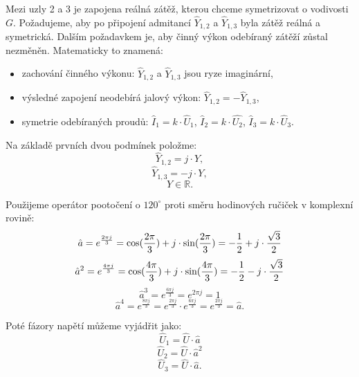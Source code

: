\documentclass{article}
\begin{document}
Mezi uzly 2 a 3 je zapojena reálná zátěž, kterou chceme symetrizovat o vodivosti $G$. Požadujeme, aby po připojení admitancí $\hat{Y}_{1,2}$ a $\hat{Y}_{1,3}$ byla zátěž reálná a symetrická. Dalším požadavkem je, aby činný výkon odebíraný zátěží zůstal nezměněn. Matematicky to znamená:
\begin{itemize}
    \item zachování činného výkonu: $\hat{Y}_{1,2}$ a $\hat{Y}_{1,3}$ jsou ryze imaginární,
    \item výsledné zapojení neodebírá jalový výkon: $\hat{Y}_{1,2} = - \hat{Y}_{1,3}$,
    \item symetrie odebíraných proudů: $\hat{I}_1 = k \cdot \hat{U}_1$, $\hat{I}_2 = k \cdot \hat{U_2}$, $\hat{I}_3 = k \cdot \hat{U}_3$.
\end{itemize}

Na základě prvních dvou podmínek položme:
$$
    \hat{Y}_{1,2} = j \cdot Y,
$$
$$
    \hat{Y}_{1,3} = -j \cdot Y,
$$
$$
    Y \in \mathbb{R}.
$$

Použijeme operátor pootočení o $120^\circ$ proti směru hodinových ručiček v komplexní rovině:
$$
    \hat{a} = e^{\frac{2 \pi j}{3}} = \textrm{cos}(\frac{2 \pi}{3}) + j \cdot \textrm{sin}(\frac{2 \pi}{3}) = -\frac{1}{2} + j \cdot \frac{\sqrt{3}}{2}
$$
$$
    \hat{a}^2 = e^{\frac{4 \pi j}{3}} = \textrm{cos}(\frac{4 \pi}{3}) + j \cdot \textrm{sin}(\frac{4 \pi}{3}) = -\frac{1}{2} - j \cdot \frac{\sqrt{3}}{2}
$$
$$
    \hat{a}^3 = e^{\frac{6 \pi j}{3}} = e^{2 \pi j} = 1
$$
$$
    \hat{a}^4 = e^{\frac{8 \pi j}{3}} = e^{\frac{2 \pi j}{3}} \cdot e^{\frac{6 \pi j}{3}} = e^{\frac{2 \pi j}{3}} = \hat{a}.
$$

Poté fázory napětí můžeme vyjádřit jako:
$$
    \hat{U}_1 = \hat{U} \cdot \hat{a}
$$
$$
    \hat{U}_2 = \hat{U} \cdot \hat{a}^2
$$
$$
    \hat{U}_3 = \hat{U} \cdot \hat{a}.
$$
\end{document}
